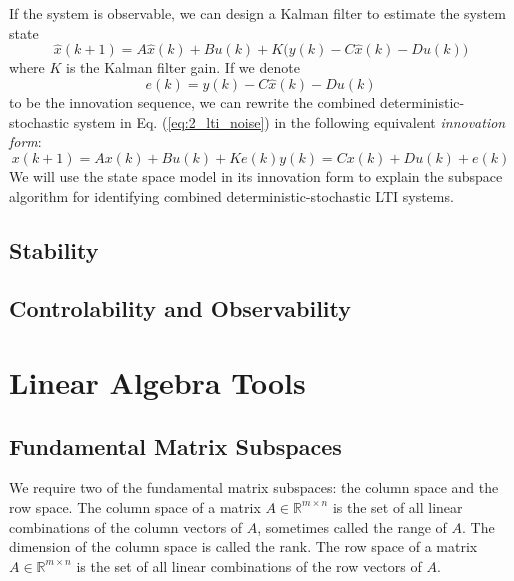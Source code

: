 If the system is observable, we can design a Kalman filter to estimate the system state \cite{kalman1960new}
\begin{equation*}
\hat{x}(k+1) = A\hat{x}(k) + Bu(k) + K\big(y(k) - C\hat{x}(k) - Du(k)\big)
\end{equation*}
where $K$ is the Kalman filter gain. If we denote 
\begin{equation*}
e(k) = y(k) - C\hat{x}(k) - Du(k)
\end{equation*}
to be the innovation sequence, we can rewrite the combined deterministic-stochastic system in Eq. (\ref{eq:2_lti_noise}) in the following equivalent \textit{innovation form}:
\begin{subequations}\label{eq:2_innovation}
\begin{equation}x(k+1) = Ax(k) + Bu(k) + Ke(k)\end{equation}
\begin{equation}y(k) = Cx(k) + Du(k) + e(k)\end{equation}
\end{subequations}
We will use the state space model in its innovation form to explain the subspace algorithm for identifying combined deterministic-stochastic LTI systems.

\subsection{Stability}


\subsection{Controlability and Observability}



\section{Linear Algebra Tools}

\subsection{Fundamental Matrix Subspaces}
We require two of the fundamental matrix subspaces: the column space and the row space. The column space of a matrix $A \in \mathbb{R}^{m\times n}$ is the set of all linear combinations of the column vectors of $A$, sometimes called the range of $A$. The dimension of the column space is called the rank. The row space of a matrix $A \in \mathbb{R}^{m\times n}$ is the set of all linear combinations of the row vectors of $A$.


